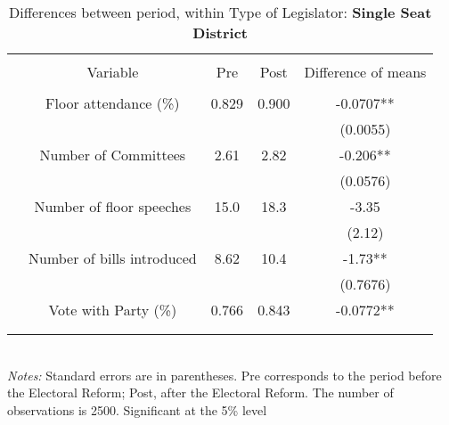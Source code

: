 \documentclass{article}
\begin{document}
\begin{table}[!htbp] \centering 
	\caption{Differences between period, within Type of Legislator: \textbf{Single Seat District}}
	\begin{tabular}{@{\extracolsep{4pt}} ccccc} 
		\\[-1.8ex]\hline 
		\hline \\[-1.8ex] 
		& Variable & Pre & Post & Difference of means  \\ 
		\hline \\[-1.8ex] 
		& Floor attendance (\%) & 0.829  & 0.900 & -0.0707**  \\ 
		& &   &  &  (0.0055) \\ 
		& Number of Committees   &  2.61 &  2.82 & -0.206**   \\ 
		& &   &  &  (0.0576) \\ 
		& Number of floor speeches   &  15.0 &18.3 &  -3.35 \\ 
		& &   &  & (2.12) \\ 
		& Number of bills introduced  &  8.62  & 10.4  & -1.73**\\ 
		& &   &  &  (0.7676) \\ 
		& Vote with Party (\%)   &  0.766& 0.843   &   -0.0772**\\ 
		& &   &  &   \\ 
		\hline \\[-1.8ex] 
	\end{tabular} 
	\\
	\textit{Notes:} Standard errors are in parentheses. Pre corresponds to the period before the Electoral Reform; Post, after the Electoral Reform. The number of observations is 2500. Significant at the 5\% level 
\end{table} 
\end{document}
